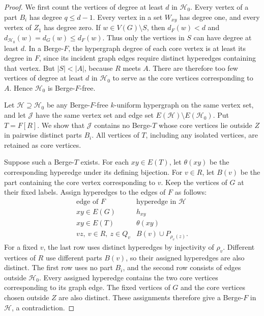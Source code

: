 \documentclass[11pt,a4paper]{article}
\numberwithin{equation}{section}
\theoremstyle{definition}
\theoremstyle{plain}
\newcommand{\HH}{\mathcal H}
\newcommand{\JJ}{\mathcal J}
\begin{document}
\begin{proof}
We first count the vertices of degree at least $d$ in $\HH_0$.
Every vertex of a part $B_i$ has degree $q\le d-1$.
Every vertex in a set $W_{xy}$ has degree one, and every vertex of
$Z_1$ has degree zero. If $w\in V(G)\setminus S$, then $d_F(w)<d$
and $d_{\HH_0}(w)=d_G(w)\le d_F(w)$. Thus only the vertices in $S$
can have degree at least $d$.
In a Berge-$F$, the hypergraph degree of each core vertex is at least
its degree in $F$, since its incident graph edges require distinct
hyperedges containing that vertex. But $|S|<|A|$, because $R$ meets
$A$. There are therefore too few vertices of degree at least $d$ in
$\HH_0$ to serve as the core vertices corresponding to $A$.
Hence $\HH_0$ is Berge-$F$-free.

Let $\HH\supseteq\HH_0$ be any Berge-$F$-free $k$-uniform hypergraph
on the same vertex set, and let $\JJ$ have the same vertex set and
edge set $E(\HH)\setminus E(\HH_0)$. Put $T=F[R]$.
We show that $\JJ$ contains no Berge-$T$ whose core vertices lie
outside $Z$ in pairwise distinct parts $B_i$. All vertices of $T$,
including any isolated vertices, are retained as core vertices.

Suppose such a Berge-$T$ exists. For each $xy\in E(T)$, let
$\theta(xy)$ be the corresponding hyperedge under its defining
bijection. For $v\in R$, let $B(v)$ be the part containing the core
vertex corresponding to $v$. Keep the vertices of $G$ at their fixed
labels. Assign hyperedges to the edges of $F$ as follows:
\begin{equation}\label{eq:edge-assignment}
 \begin{array}{c|l}
 \text{edge of }F&\text{hyperedge in }\HH\\ \hline
 xy\in E(G)&h_{xy}\\
 xy\in E(T)&\theta(xy)\\
 vz,\ v\in R,\ z\in Q_v&B(v)\cup P_{\rho_v(z)}.
 \end{array}
\end{equation}
For a fixed $v$, the last row uses distinct hyperedges by injectivity
of $\rho_v$. Different vertices of $R$ use different parts $B(v)$,
so their assigned hyperedges are also distinct.
The first row uses no part $B_i$, and the second row consists of
edges outside $\HH_0$. Every assigned hyperedge contains the two
core vertices corresponding to its graph edge. The fixed vertices
of $G$ and the core vertices chosen outside $Z$ are also distinct.
These assignments therefore give a Berge-$F$ in $\HH$, a contradiction.


\end{proof}
\end{document}
